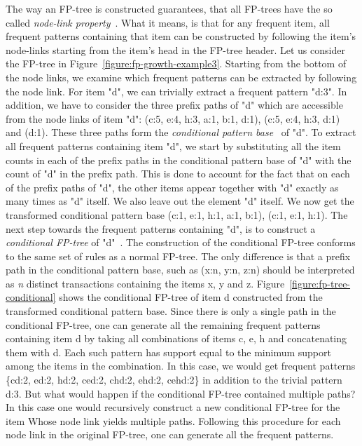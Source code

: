 The way an FP-tree is constructed guarantees, that all FP-trees have the so called \textit{node-link property}~\cite{Hipp:2000:AAR:360402.360421}. What it means, is that for any frequent item, all frequent patterns containing that item can be constructed by following the item's node-links starting from the item's head in the FP-tree header. Let us consider the FP-tree in Figure~\ref{figure:fp-growth-example3}. Starting from the bottom of the node links, we examine which frequent patterns can be extracted by following the node link. For item "d", we can trivially extract a frequent pattern "d:3". In addition, we have to consider the three prefix paths of "d" which are accessible from the node links of item "d": (c:5, e:4, h:3, a:1, b:1, d:1), (c:5, e:4, h:3, d:1) and (d:1). These three paths form the \textit{conditional pattern base}~\cite{Hipp:2000:AAR:360402.360421} of "d". To extract all frequent patterns containing item "d", we start by substituting all the item counts in each of the prefix paths in the conditional pattern base of "d" with the count of "d" in the prefix path. This is done to account for the fact that on each of the prefix paths of "d", the other items appear together with "d" exactly as many times as "d" itself. We also leave out the element "d" itself. We now get the transformed conditional pattern base (c:1, e:1, h:1, a:1, b:1), (c:1, e:1, h:1). The next step towards the frequent patterns containing "d", is to construct a \textit{conditional FP-tree} of "d"~\cite{Hipp:2000:AAR:360402.360421}. The construction of the conditional FP-tree conforms to the same set of rules as a normal FP-tree. The only difference is that a prefix path in the conditional pattern base, such as (x:n, y:n, z:n) should be interpreted as \textit{n} distinct transactions containing the items x, y and z. Figure~\ref{figure:fp-tree-conditional} shows the conditional FP-tree of item d constructed from the transformed conditional pattern base. Since there is only a single path in the conditional FP-tree, one can generate all the remaining frequent patterns containing item d by taking all combinations of items c, e, h and concatenating them with d. Each such pattern has support equal to the minimum support among the items in the combination. In this case, we would get frequent patterns \{cd:2, ed:2, hd:2, ced:2, chd:2, ehd:2, cehd:2\} in addition to the trivial pattern d:3. But what would happen if the conditional FP-tree contained multiple paths? In this case one would recursively construct a new conditional FP-tree for the item Whose node link yields multiple paths. Following this procedure for each node link in the original FP-tree, one can generate all the frequent patterns.  


